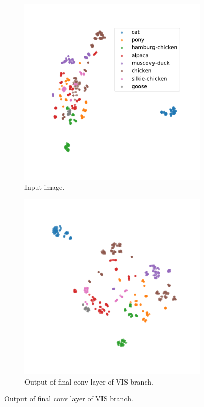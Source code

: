 \documentclass{l4proj}
\begin{document}
\begin{figure}[ht]
  \centering
  \begin{subfigure}[h!]{0.4\textwidth}
    \includegraphics[width=\textwidth, trim={1cm 1cm 1cm 1cm}, clip]{images/evaluation/embedding/val/input}
    \caption{Input image.}
    \label{fig:test_tsne_input}
  \end{subfigure}
  \quad
  \begin{subfigure}[h!]{0.4\textwidth}
    \includegraphics[width=\textwidth, trim={1cm 1cm 1cm 1cm}, clip]{images/evaluation/embedding/val/vis}
    \caption{Output of final conv layer of VIS branch.}
    \label{fig:test_tsne_vis}
  \end{subfigure}


\end{figure}
\end{document}
